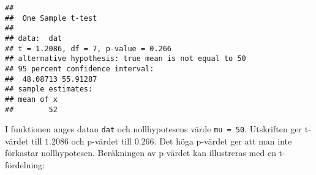\documentclass[
]{book}
\newenvironment{Shaded}{\begin{snugshade}}{\end{snugshade}}
\newcommand{\AttributeTok}[1]{\textcolor[rgb]{0.77,0.63,0.00}{#1}}
\newcommand{\DecValTok}[1]{\textcolor[rgb]{0.00,0.00,0.81}{#1}}
\newcommand{\FloatTok}[1]{\textcolor[rgb]{0.00,0.00,0.81}{#1}}
\newcommand{\FunctionTok}[1]{\textcolor[rgb]{0.00,0.00,0.00}{#1}}
\newcommand{\NormalTok}[1]{#1}
\newcommand{\OtherTok}[1]{\textcolor[rgb]{0.56,0.35,0.01}{#1}}
\newcommand{\SpecialCharTok}[1]{\textcolor[rgb]{0.00,0.00,0.00}{#1}}
\newcommand{\StringTok}[1]{\textcolor[rgb]{0.31,0.60,0.02}{#1}}
\theoremstyle{definition}
\theoremstyle{definition}
\theoremstyle{definition}
\theoremstyle{definition}
\theoremstyle{remark}
\begin{document}
\begin{verbatim}
## 
##  One Sample t-test
## 
## data:  dat
## t = 1.2086, df = 7, p-value = 0.266
## alternative hypothesis: true mean is not equal to 50
## 95 percent confidence interval:
##  48.08713 55.91287
## sample estimates:
## mean of x 
##        52
\end{verbatim}

I funktionen anges datan \texttt{dat} och nollhypotesens värde \texttt{mu\ =\ 50}. Utskriften ger t-värdet till \(1.2086\) och p-värdet till \(0.266\). Det höga p-värdet ger att man inte förkastar nollhypotesen. Beräkningen av p-värdet kan illustreras med en t-fördelning:

\begin{Shaded}
\end{Shaded}
\end{document}
